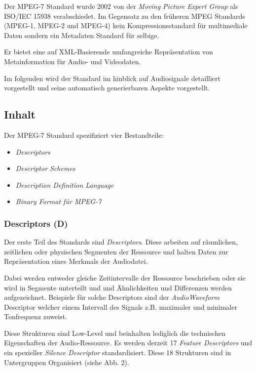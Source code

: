 	Der MPEG-7 Standard wurde 2002 von der \emph{Moving Picture Expert Group} als ISO/IEC 15938 verabschiedet. Im Gegensatz zu den früheren MPEG Standards (MPEG-1, MPEG-2 und MPEG-4) kein Kompressionsstandard für multimediale Daten sondern ein Metadaten Standard für selbige.
	
	Er bietet eine auf XML-Basierende umfangreiche Repräsentation von Metainformation für Audio- und Videodaten.
	
	Im folgenden wird der Standard im hinblick auf Audiosignale detailliert vorgestellt und seine automatisch generierbaren Aspekte vorgestellt.
	
	\subsection{Inhalt}
	
	Der MPEG-7 Standard spezifiziert vier Bestandteile:
	
	\begin{itemize}
		\item \emph{Descriptors}
		\item \emph{Descriptor Schemes}
		\item \emph{Description Definition Language}
		\item \emph{Binary Format für MPEG-7}
	\end{itemize}
	
	\subsubsection {Descriptors (D)}
	
Der erste Teil des Standards sind \emph{Descriptors}. Diese arbeiten auf räumlichen, zeitlichen oder physischen Segmenten der Ressource und  halten Daten zur Repräsentation eines Merkmals der Audiodatei.

	Dabei werden entweder gleiche Zeitintervalle der Ressource beschrieben oder sie wird in Segmente unterteilt und und Ähnlichkeiten und Differenzen werden aufgezeichnet. Beispiele für solche Descriptors sind der \emph{AudioWaveform} Descriptor welcher einem Intervall des Signals z.B. maximaler und minimaler Tonfrequenz zuweist.

	Diese Strukturen sind Low-Level und beinhalten lediglich die technischen Eigenschaften der Audio-Ressource. Es werden derzeit 17 \emph{Feature Descriptors} und ein spezieller \emph{Silence Descriptor} standardisiert. Diese 18 Strukturen sind in Untergruppen Organisiert (siehe Abb. 2).


